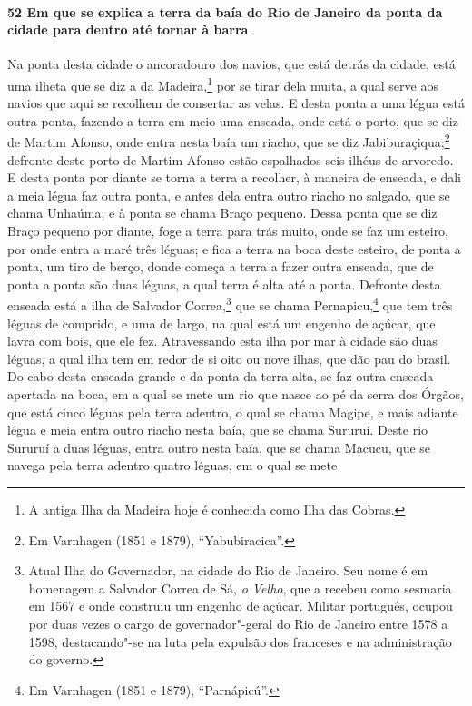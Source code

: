 \begin{linenumbers}
\paragraph{52 Em que se explica a terra da baía do Rio de Janeiro da ponta da cidade para
dentro até tornar à barra} \quad
Na ponta desta cidade o ancoradouro dos navios, que está detrás da cidade, está uma ilheta
que se diz a da Madeira,\footnote{ A antiga Ilha da Madeira hoje é conhecida como Ilha das
Cobras.} por se tirar dela muita, a qual serve aos navios que aqui se recolhem de
consertar as velas. E desta ponta a uma légua está outra ponta, fazendo a terra em meio
uma enseada, onde está o porto, que se diz de Martim Afonso, onde entra nesta baía um
riacho, que se diz Jabiburaçiqua;\footnote{ Em Varnhagen (1851 e 1879), ``Yabubiracica''.}
defronte deste porto de Martim Afonso estão espalhados seis ilhéus de arvoredo. E desta
ponta por diante se torna a terra a recolher, à maneira de enseada, e dali a meia légua
faz outra ponta, e antes dela entra outro riacho no salgado, que se chama Unhaúma; e à
ponta se chama Braço pequeno. Dessa ponta que se diz Braço pequeno por diante, foge a
terra para trás muito, onde se faz um esteiro, por onde entra a maré três léguas; e fica a
terra na boca deste esteiro, de ponta a ponta, um tiro de berço, donde começa a terra a
fazer outra enseada, que de ponta a ponta são duas léguas, a qual terra é alta até a
ponta. Defronte desta enseada está a ilha de Salvador Correa,\footnote{ Atual Ilha do
Governador, na cidade do Rio de Janeiro. Seu nome é em homenagem a Salvador Correa de Sá,
\textit{o Velho}, que a recebeu como sesmaria em 1567 e onde construiu um engenho de
açúcar. Militar português, ocupou por duas vezes o cargo de governador"-geral do Rio de
Janeiro entre 1578 a 1598, destacando"-se na luta pela expulsão dos franceses e na
administração do governo.} que se chama Pernapicu,\footnote{ Em Varnhagen (1851 e 1879),
``Parnápicú''.} que tem três léguas de comprido, e uma de largo, na qual está um engenho
de açúcar, que lavra com bois, que ele fez. Atravessando esta ilha por mar à cidade são
duas léguas, a qual ilha tem em redor de si oito ou nove ilhas, que dão pau do brasil. Do
cabo desta enseada grande e da ponta da terra alta, se faz outra enseada apertada na boca,
em a qual se mete um rio que nasce ao pé da serra dos Órgãos, que está cinco léguas pela
terra adentro, o qual se chama Magipe, e mais adiante légua e meia entra outro riacho
nesta baía, que se chama Sururuí. Deste rio Sururuí a duas léguas, entra outro nesta baía,
que se chama Macucu, que se navega pela terra adentro quatro léguas, em o qual se mete

\end{linenumbers}
